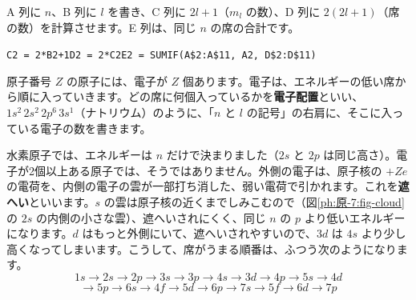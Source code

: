 A 列に $n$、B 列に $l$ を書き、C 列に $2l+1$（$m_l$ の数）、D 列に $2(2l+1)$（席の数）を計算させます。E 列は、同じ $n$ の席の合計です。
\begin{bkcenter}\small
\texttt{C2 = 2*B2+1}\quad\texttt{D2 = 2*C2}\quad\texttt{E2 = SUMIF(A\$2:A\$11, A2, D\$2:D\$11)}
\end{bkcenter}
\begin{bkcenter}
\label{ph:原-7:tab-sheet}
\end{bkcenter}

\label{ph:原-7:sec5}
原子番号 $Z$ の原子には、電子が $Z$ 個あります。電子は、エネルギーの低い席から順に入っていきます。どの席に何個入っているかを\textbf{電子配置}といい、$1s^2\,2s^2\,2p^6\,3s^1$（ナトリウム）のように、「$n$ と $l$ の記号」の右肩に、そこに入っている電子の数を書きます。

水素原子では、エネルギーは $n$ だけで決まりました（$2s$ と $2p$ は同じ高さ）。電子が2個以上ある原子では、そうではありません。外側の電子は、原子核の $+Ze$ の電荷を、内側の電子の雲が一部打ち消した、弱い電荷で引かれます。これを\textbf{遮へい}といいます。$s$ の雲は原子核の近くまでしみこむので（図\ref{ph:原-7:fig-cloud}の $2s$ の内側の小さな雲）、遮へいされにくく、同じ $n$ の $p$ より低いエネルギーになります。$d$ はもっと外側にいて、遮へいされやすいので、$3d$ は $4s$ より少し高くなってしまいます。こうして、席がうまる順番は、ふつう次のようになります。
\[ 1s\to2s\to2p\to3s\to3p\to4s\to3d\to4p\to5s\to4d \]
\[ \to5p\to6s\to4f\to5d\to6p\to7s\to5f\to6d\to7p \]


